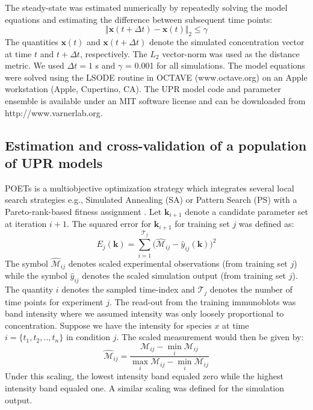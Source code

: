 \documentclass[fleqn,10pt]{wlscirep}
\begin{document}
The steady-state was estimated numerically by repeatedly solving the model equations and estimating the difference between subsequent time points:
\begin{equation}
\Vert\mathbf{x}\left(t+\Delta{t}\right) - \mathbf{x}\left(t\right)\Vert_{2}\leq\gamma
\end{equation}
The quantities $\mathbf{x}\left(t\right)$ and $\mathbf{x}\left(t+\Delta{t}\right)$ denote the simulated concentration vector at time $t$ and $t + \Delta{t}$, respectively.
The $L_{2}$ vector-norm was used as the distance metric. We used $\Delta{t} = 1$ s and $\gamma$ = 0.001 for all simulations.
The model equations were solved using the LSODE routine in OCTAVE (www.octave.org) on an Apple workstation (Apple, Cupertino, CA).
The UPR model code and parameter ensemble is available under an MIT software license and can be downloaded from http://www.varnerlab.org.

\subsection*{Estimation and cross-validation of a population of UPR models}
POETs is a multiobjective optimization strategy which integrates several local search strategies e.g., Simulated Annealing (SA) or Pattern Search (PS)
with a Pareto-rank-based fitness assignment \cite{Song:2010ij}.
Let $\mathbf{k}_{i+1}$ denote a candidate parameter set at iteration $i+1$.
The squared error for $\mathbf{k}_{i+1}$ for training set $j$ was defined as:
\begin{equation}\label{eqn_cost2}
	E_{j}(\mathbf{k}) = \sum_{i=1}^{\mathcal{T}_{j}}\biggl(\hat{\mathcal{M}}_{ij}-\hat{y}_{ij}(\mathbf{k})\biggr)^2
\end{equation}
The symbol $\hat{\mathcal{M}}_{ij}$ denotes scaled experimental observations (from training set $j$) while the symbol $\hat{y}_{ij}$ denotes the scaled simulation output (from training set $j$).
The quantity $i$ denotes the sampled time-index and $\mathcal{T}_{j}$ denotes the number of time points for experiment $j$.
The read-out from the training immunoblots was band intensity where we assumed intensity was only loosely proportional to concentration.
Suppose we have the intensity for species $x$ at time $i=\{t_{1},t_{2},..,t_{n}\}$ in condition $j$. The scaled measurement would then be given by:
\begin{equation}\label{norm_exp_data}
\hat{\mathcal{M}}_{ij} = \frac{\mathcal{M}_{ij} - \min_{i}\mathcal{M}_{ij}}{\max_{i}{\mathcal{M}_{ij}}-\min_{i}{\mathcal{M}_{ij}}}
\end{equation}
Under this scaling, the lowest intensity band equaled zero while the highest intensity band equaled one.
A similar scaling was defined for the simulation output.
\end{document}
